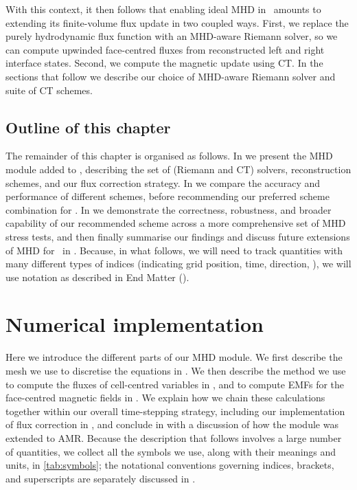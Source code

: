 With this context, it then follows that enabling ideal MHD in \quokka~amounts to extending its finite-volume flux update in two coupled ways. First, we replace the purely hydrodynamic flux function with an MHD-aware Riemann solver, so we can compute upwinded face-centred fluxes from reconstructed left and right interface states. Second, we compute the magnetic update using CT. In the sections that follow we describe our choice of MHD-aware Riemann solver and suite of CT schemes.

\subsection{Outline of this chapter}

The remainder of this chapter is organised as follows. In  we present the MHD module added to \quokka, describing the set of (Riemann and CT) solvers, reconstruction schemes, and our flux correction strategy. In  we compare the accuracy and performance of different schemes, before recommending our preferred scheme combination for \quokka. In  we demonstrate the correctness, robustness, and broader capability of our recommended scheme across a more comprehensive set of MHD stress tests, and then finally summarise our findings and discuss future extensions of MHD for \quokka~in . Because, in what follows, we will need to track quantities with many different types of indices (indicating grid position, time, direction, \etc), we will use notation as described in End Matter ().


\section{Numerical implementation}
\label{sec:method}

Here we introduce the different parts of our MHD module. We first describe the mesh we use to discretise the equations in . We then describe the method we use to compute the fluxes of cell-centred variables in , and to compute EMFs for the face-centred magnetic fields in . We explain how we chain these calculations together within our overall time-stepping strategy, including our implementation of flux correction in , and conclude in  with a discussion of how the module was extended to AMR. Because the description that follows involves a large number of quantities, we collect all the symbols we use, along with their meanings and units, in \cref{tab:symbols}; the notational conventions governing indices, brackets, and superscripts are separately discussed in .

